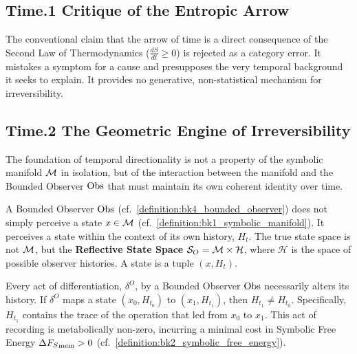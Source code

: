 \subsection*{Time.1 Critique of the Entropic Arrow}
\label{subsec:appC_time_critique_rigorous}
The conventional claim that the arrow of time is a direct consequence of the Second Law of Thermodynamics ($\frac{dS}{dt} \geq 0$) is rejected as a category error. It mistakes a symptom for a cause and presupposes the very temporal background it seeks to explain. It provides no generative, non-statistical mechanism for irreversibility.

\subsection*{Time.2 The Geometric Engine of Irreversibility}
\label{subsec:appC_time_geometric_engine_final}
The foundation of temporal directionality is not a property of the symbolic manifold \(\mathcal{M}\) in isolation, but of the interaction between the manifold and the Bounded Observer \(\mathrm{Obs}\) that must maintain its own coherent identity over time.

\begin{definition}
\label{definition:appC_reflective_state_space}
A Bounded Observer \(\mathrm{Obs}\) (cf.~\ref{definition:bk4_bounded_observer}) does not simply perceive a state \(x \in \mathcal{M}\) (cf.~\ref{definition:bk1_symbolic_manifold}). It perceives a state within the context of its own history, \(H_t\). The true state space is not \(\mathcal{M}\), but the \textbf{Reflective State Space} \(\mathcal{S}_O = \mathcal{M} \times \mathcal{H}\), where \(\mathcal{H}\) is the space of possible observer histories. A state is a tuple \((x, H_t)\).
\end{definition}

\begin{axiom}
\label{axiom:appC_axiom_of_memory}
Every act of differentiation, \(\delta^O\), by a Bounded Observer \(\mathrm{Obs}\) necessarily alters its history. If \(\delta^O\) maps a state \((x_0, H_{t_0})\) to \((x_1, H_{t_1})\), then \(H_{t_1} \neq H_{t_0}\). Specifically, \(H_{t_1}\) contains the trace of the operation that led from \(x_0\) to \(x_1\). This act of recording is metabolically non-zero, incurring a minimal cost in Symbolic Free Energy \(\Delta{F_S}_{\text{mem}} > 0\) (cf.~\ref{definition:bk2_symbolic_free_energy}).
\end{axiom}

